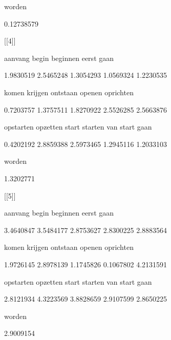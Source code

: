         worden 



    0.12738579 



[[4]]



       aanvang          begin       beginnen          eerst           gaan 



     1.9830519      2.5465248      1.3054293      1.0569324      1.2230535 



         komen        krijgen       ontstaan         openen      oprichten 



     0.7203757      1.3757511      1.8270922      2.5526285      2.5663876 



     opstarten       opzetten          start        starten van start gaan 



     0.4202192      2.8859388      2.5973465      1.2945116      1.2033103 



        worden 



     1.3202771 



[[5]]



       aanvang          begin       beginnen          eerst           gaan 



     3.4640847      3.5484177      2.8753627      2.8300225      2.8883564 



         komen        krijgen       ontstaan         openen      oprichten 



     1.9726145      2.8978139      1.1745826      0.1067802      4.2131591 



     opstarten       opzetten          start        starten van start gaan 



     2.8121934      4.3223569      3.8828659      2.9107599      2.8650225 



        worden 



     2.9009154 



